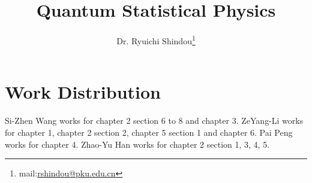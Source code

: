 \documentclass[twoside]{book}
\numberwithin{equation}{section}
\begin{document}
\title{Quantum Statistical Physics}
\author{Dr. Ryuichi Shindou\footnote{mail:\href{mailto:rshindou@pku.edu.cn}{rshindou@pku.edu.cn}}}
\maketitle


\tableofcontents

















\newpage

\chapter*{Work Distribution}
Si-Zhen Wang works for chapter 2 section 6 to 8 and chapter 3. ZeYang-Li works for chapter 1, chapter 2 section 2, chapter 5 section 1 and chapter 6. Pai Peng works for chapter 4. Zhao-Yu Han works for chapter 2 section 1, 3, 4, 5. 
\end{document}
